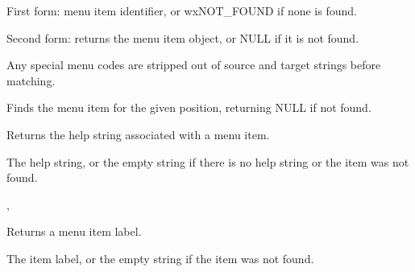 First form: menu item identifier, or wxNOT\_FOUND if none is found.

Second form: returns the menu item object, or NULL if it is not found.


Any special menu codes are stripped out of source and target strings
before matching.


\label{wxmenufinditembyposition}


Finds the menu item for the given position, returning NULL if not found.

\label{wxmenugethelpstring}


Returns the help string associated with a menu item.




The help string, or the empty string if there is no help string or the
item was not found.


, 

\label{wxmenugetlabel}


Returns a menu item label.




The item label, or the empty string if the item was not found.



\label{wxmenugetmenuitemcount}


